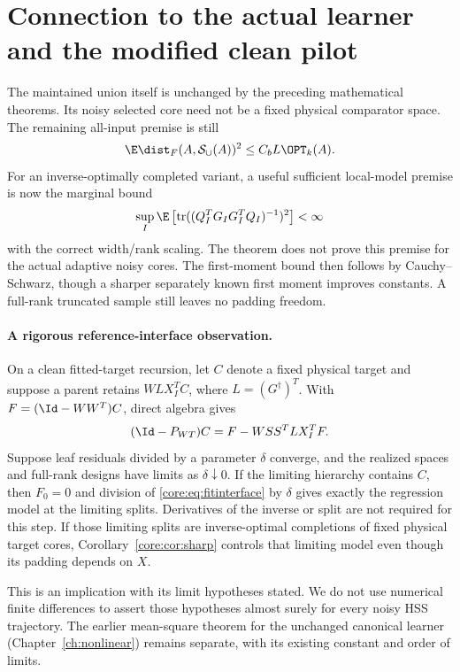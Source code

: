 \documentclass[11pt,oneside,openany,a4paper]{book}
\numberwithin{equation}{chapter}
\theoremstyle{definition}
\theoremstyle{remark}
\DeclareMathOperator{\tr}{tr}\DeclareMathOperator{\rank}{rank}
\begin{document}
\section{Connection to the actual learner and the modified clean pilot}\label{core:sec:pilot}
The maintained union itself is unchanged by the preceding mathematical theorems. Its noisy selected core need not be a fixed physical comparator space. The remaining all-input premise is still
\[
 \E\dist_F(A,\mathcal S_\cup(A))^2\le C_bL\OPT_k(A).
\]
For an inverse-optimally completed variant, a useful sufficient local-model premise is now the marginal bound
\[
 \sup_I\E\left[\tr((Q_I^TG_IG_I^TQ_I)^{-1})^2\right]<\infty
\]
with the correct width/rank scaling. The theorem does not prove this premise for the actual adaptive noisy cores. The first-moment bound then follows by Cauchy--Schwarz, though a sharper separately known first moment improves constants. A full-rank truncated sample still leaves no padding freedom.

\paragraph{A rigorous reference-interface observation.}
On a clean fitted-target recursion, let $C$ denote a fixed physical target and suppose a parent retains $WLX_I^TC$, where $L=(G^\dagger)^T$. With $F=(\Id-WW^T)C$, direct algebra gives
\begin{equation}\label{core:eq:fitinterface}
 (\Id-P_{WT})C=F-WSS^TLX_I^TF.
\end{equation}
Suppose leaf residuals divided by a parameter $\delta$ converge, and the realized spaces and full-rank designs have limits as $\delta\downarrow0$. If the limiting hierarchy contains $C$, then $F_0=0$ and division of \eqref{core:eq:fitinterface} by $\delta$ gives exactly the regression model at the limiting splits. Derivatives of the inverse or split are not required for this step. If those limiting splits are inverse-optimal completions of fixed physical target cores, Corollary~\ref{core:cor:sharp} controls that limiting model even though its padding depends on $X$.

This is an implication with its limit hypotheses stated. We do not use numerical finite differences to assert those hypotheses almost surely for every noisy HSS trajectory. The earlier mean-square theorem for the unchanged canonical learner (Chapter~\ref{ch:nonlinear}) remains separate, with its existing constant and order of limits.
\end{document}
